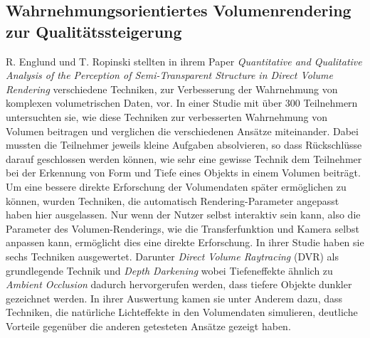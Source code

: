 \subsection{Wahrnehmungsorientiertes Volumenrendering zur Qualitätssteigerung}\label{ss::wovrzq}
R. Englund und T. Ropinski stellten in ihrem Paper \emph{Quantitative and Qualitative Analysis of the Perception of Semi-Transparent Structure in Direct Volume Rendering} \cite{doi:10.1111/cgf.13320} verschiedene Techniken, zur Verbesserung der Wahrnehmung von komplexen volumetrischen Daten, vor.
In einer Studie mit über 300 Teilnehmern untersuchten sie, wie diese Techniken zur verbesserten Wahrnehmung von Volumen beitragen und verglichen die verschiedenen Ansätze miteinander.
Dabei mussten die Teilnehmer jeweils kleine Aufgaben absolvieren, so dass Rückschlüsse darauf geschlossen werden können, wie sehr eine gewisse Technik dem Teilnehmer bei der Erkennung von Form und Tiefe eines Objekts in einem Volumen beiträgt.
Um eine bessere direkte Erforschung der Volumendaten später ermöglichen zu können, wurden Techniken, die automatisch Rendering-Parameter angepasst haben hier ausgelassen.
Nur wenn der Nutzer selbst interaktiv sein kann, also die Parameter des Volumen-Renderings, wie die Transferfunktion und Kamera selbst anpassen kann, ermöglicht dies eine direkte Erforschung.
In ihrer Studie haben sie sechs Techniken ausgewertet. Darunter \emph{Direct Volume Raytracing} (DVR) als grundlegende Technik und \emph{Depth Darkening} wobei Tiefeneffekte ähnlich zu \emph{Ambient Occlusion} dadurch hervorgerufen werden, dass tiefere Objekte dunkler gezeichnet werden. 
In ihrer Auswertung kamen sie unter Anderem dazu, dass Techniken, die natürliche Lichteffekte in den Volumendaten simulieren, deutliche Vorteile gegenüber die anderen getesteten Ansätze gezeigt haben.

